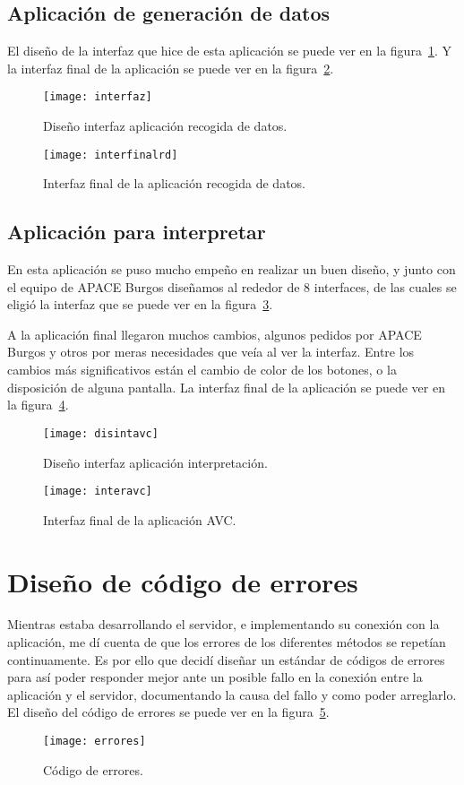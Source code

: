 \subsection{Aplicación de generación de datos}
El diseño de la interfaz que hice de esta aplicación se puede ver en la figura~\ref{fig:digd}. Y la interfaz final de la aplicación se puede ver en la figura~\ref{fig:digdfinal}.
\begin{figure}
	\centering
	\texttt{[image: interfaz]}
	\caption{Diseño interfaz aplicación recogida de datos.}
	\label{fig:digd}
\end{figure}

\begin{figure}
	\centering
	\texttt{[image: interfinalrd]}
	\caption{Interfaz final de la aplicación recogida de datos.}
	\label{fig:digdfinal}
\end{figure}
\subsection{Aplicación para interpretar}
En esta aplicación se puso mucho empeño en realizar un buen diseño, y junto con el equipo de APACE Burgos diseñamos al rededor de 8 interfaces, de las cuales se eligió la interfaz que se puede ver en la figura~\ref{fig:diinter}.

A la aplicación final llegaron muchos cambios, algunos pedidos por APACE Burgos y otros por meras necesidades que veía al ver la interfaz. Entre los cambios más significativos están el cambio de color de los botones, o la disposición de alguna pantalla. La interfaz final de la aplicación se puede ver en la figura~\ref{fig:intfin}.

\begin{figure}[H]
	\centering
	\texttt{[image: disintavc]}
	\caption{Diseño interfaz aplicación interpretación.}
	\label{fig:diinter}
\end{figure}

\begin{figure}[H]
	\centering
	\texttt{[image: interavc]}
	\caption{Interfaz final de la aplicación AVC.}
	\label{fig:intfin}
\end{figure}

\section{Diseño de código de errores}
Mientras estaba desarrollando el servidor, e implementando su conexión con la aplicación, me dí cuenta de que los errores de los diferentes métodos se repetían continuamente. Es por ello que decidí diseñar un estándar de códigos de errores para así poder responder mejor ante un posible fallo en la conexión entre la aplicación y el servidor, documentando la causa del fallo y como poder arreglarlo. El diseño del código de errores se puede ver en la figura~\ref{fig:errores}.

\begin{figure}[H]
	\centering
	\texttt{[image: errores]}
	\caption{Código de errores.}
	\label{fig:errores}
\end{figure}

